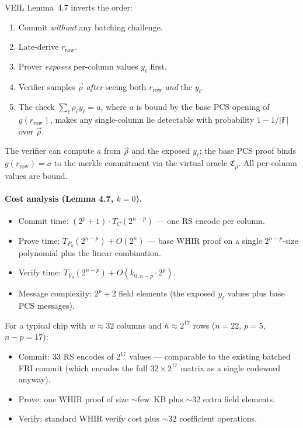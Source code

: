 VEIL Lemma~4.7 inverts the order:
\begin{enumerate}
  \item Commit \emph{without} any batching challenge.
  \item Late-derive $r_{\mathrm{row}}$.
  \item Prover \emph{exposes} per-column values $y_\ell$ first.
  \item Verifier samples $\vec{\rho}$ \emph{after} seeing both
        $r_{\mathrm{row}}$ \emph{and} the $y_\ell$.
  \item The check $\sum_\ell \rho_\ell y_\ell = a$, where $a$ is
        bound by the base PCS opening of $g(r_{\mathrm{row}})$, makes
        any single-column lie detectable with probability
        $1 - 1/|\mathbb{F}|$ over $\vec{\rho}$.
\end{enumerate}

The verifier can compute $a$ from $\vec{\rho}$ and the exposed $y_\ell$;
the base PCS proof binds $g(r_{\mathrm{row}}) = a$ to the merkle
commitment via the virtual oracle $\mathfrak{C}_\rho$.  All per-column
values are bound.

\paragraph{Cost analysis (Lemma 4.7, $k=0$).}
\begin{itemize}
  \item Commit time: $(2^p + 1) \cdot T_C(2^{n-p})$ --- one RS encode
        per column.
  \item Prove time: $T_{P_0}(2^{n-p}) + O(2^n)$ --- base WHIR proof
        on a single $2^{n-p}$-size polynomial plus the linear
        combination.
  \item Verify time: $T_{V_0}(2^{n-p}) + O(k_{0,n-p} \cdot 2^p)$.
  \item Message complexity: $2^p + 2$ field elements (the exposed
        $y_\ell$ values plus base PCS messages).
\end{itemize}

For a typical chip with $w \approx 32$ columns and $h \approx 2^{17}$
rows ($n=22$, $p=5$, $n-p=17$):
\begin{itemize}
  \item Commit: $33$ RS encodes of $2^{17}$ values --- comparable to
        the existing batched FRI commit (which encodes the full
        $32 \times 2^{17}$ matrix as a single codeword anyway).
  \item Prove: one WHIR proof of size $\sim$few~KB plus $\sim 32$
        extra field elements.
  \item Verify: standard WHIR verify cost plus $\sim 32$
        coefficient operations.
\end{itemize}

